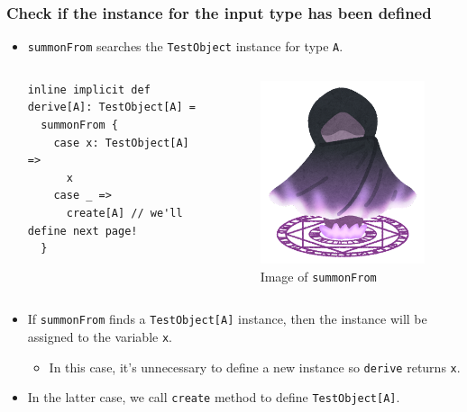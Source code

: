 \begin{frame}[fragile]
  \frametitle{ Check if the instance for the input type has been defined}

  \begin{itemize}
    \item<+-> \lstinline|summonFrom| searches the \lstinline|TestObject| instance for type \lstinline|A|.
    \begin{columns}
      \begin{column}{0.5\textwidth}
\begin{lstlisting}[style=scala]
inline implicit def derive[A]: TestObject[A] =
  summonFrom {
    case x: TestObject[A] =>
      x
    case _ =>
      create[A] // we'll define next page!
  }
\end{lstlisting}
      \end{column}
      \begin{column}{0.3\textwidth}
        \begin{figure}[h]
          \includegraphics[width=0.5\columnwidth]{./img/fantasy_mahoujin_syoukan.png}
          \caption{Image of \lstinline|summonFrom|}
        \end{figure}
      \end{column}
    \end{columns}


    \item<+-> If \lstinline|summonFrom| finds a \lstinline|TestObject[A]| instance,
    then the instance will be assigned to the variable \lstinline|x|.
    \begin{itemize}
      \item In this case, it's unnecessary to define a new instance so \lstinline|derive| returns \lstinline|x|.
    \end{itemize}

    \item<+-> In the latter case, we call \lstinline|create| method to define \lstinline|TestObject[A]|.
  \end{itemize}


\end{frame}
